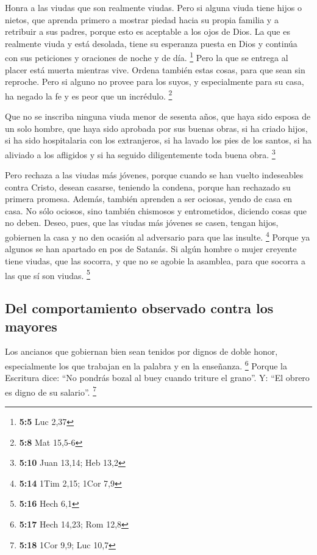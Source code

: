  Honra a las viudas que son realmente viudas.
 Pero si alguna viuda tiene hijos o nietos, que aprenda
primero a mostrar piedad hacia su propia familia y a retribuir a sus
padres, porque esto es aceptable a los ojos de Dios.  La
que es realmente viuda y está desolada, tiene su esperanza puesta en
Dios y continúa con sus peticiones y oraciones de noche y de día.
\footnote{\textbf{5:5} Luc 2,37}  Pero la que se entrega
al placer está muerta mientras vive.  Ordena también estas
cosas, para que sean sin reproche.  Pero si alguno no
provee para los suyos, y especialmente para su casa, ha negado la fe y
es peor que un incrédulo. \footnote{\textbf{5:8} Mat 15,5-6}

 Que no se inscriba ninguna viuda menor de sesenta años,
que haya sido esposa de un solo hombre,  que haya sido
aprobada por sus buenas obras, si ha criado hijos, si ha sido
hospitalaria con los extranjeros, si ha lavado los pies de los santos,
si ha aliviado a los afligidos y si ha seguido diligentemente toda buena
obra. \footnote{\textbf{5:10} Juan 13,14; Heb 13,2}

 Pero rechaza a las viudas más jóvenes, porque cuando se
han vuelto indeseables contra Cristo, desean casarse, 
teniendo la condena, porque han rechazado su primera promesa.
 Además, también aprenden a ser ociosas, yendo de casa en
casa. No sólo ociosos, sino también chismosos y entrometidos, diciendo
cosas que no deben.  Deseo, pues, que las viudas más
jóvenes se casen, tengan hijos, gobiernen la casa y no den ocasión al
adversario para que las insulte. \footnote{\textbf{5:14} 1Tim 2,15; 1Cor
  7,9}  Porque ya algunos se han apartado en pos de
Satanás.  Si algún hombre o mujer creyente tiene viudas,
que las socorra, y que no se agobie la asamblea, para que socorra a las
que sí son viudas. \footnote{\textbf{5:16} Hech 6,1}

\hypertarget{del-comportamiento-observado-contra-los-mayores}{%
\subsection{Del comportamiento observado contra los
mayores}\label{del-comportamiento-observado-contra-los-mayores}}

 Los ancianos que gobiernan bien sean tenidos por dignos
de doble honor, especialmente los que trabajan en la palabra y en la
enseñanza. \footnote{\textbf{5:17} Hech 14,23; Rom 12,8} 
Porque la Escritura dice: ``No pondrás bozal al buey cuando triture el
grano''. Y: ``El obrero es digno de su salario''. \footnote{\textbf{5:18}
  1Cor 9,9; Luc 10,7}

